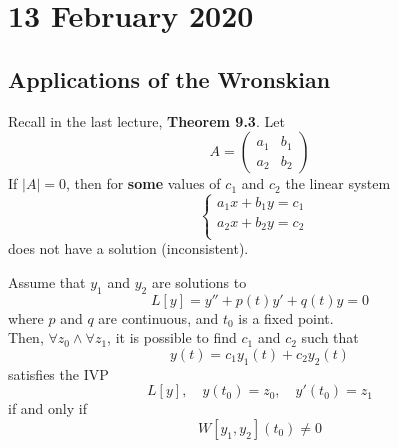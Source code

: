 \documentclass[diffeq.tex]{subfiles}
\begin{document}
\chapter{13 February 2020}
    \section{Applications of the Wronskian}
    \begin{corollary}
        Recall in the last lecture, \textbf{Theorem 9.3}.
        Let
        \begin{equation}
            A = \begin{pmatrix}
                a_{1} & b_{1}\\
                a_{2} & b_{2}
            \end{pmatrix}
        \end{equation}
        If $|A| = 0$, then for \textbf{some} values of $c_{1}$ and $c_{2}$ the linear system
        \begin{equation}
            \begin{cases}
                a_{1}x + b_{1}y = c_{1}&\\
                a_{2}x + b_{2}y = c_{2}&\\
            \end{cases}
        \end{equation}
        does not have a solution (inconsistent).
    \end{corollary}
    \np
    \begin{btheorem}
        Assume that $y_{1}$ and $y_{2}$ are solutions to
        \begin{equation}
            L[y] = y'' + p(t)y' + q(t)y = 0
        \end{equation}
        where $p$ and $q$ are continuous, and $t_{0}$ is a fixed point.\\
        Then, $\forall z_{0} \wedge \forall z_{1}$, it is possible to find $c_{1}$ and $c_{2}$ such that
        \begin{equation}
            y(t) = c_{1}y_{1}(t) + c_{2}y_{2}(t)
        \end{equation}
        satisfies the IVP
        \begin{equation}
            L[y],\quad  y(t_{0}) = z_{0},\quad y'(t_{0}) = z_{1}
        \end{equation}
        if and only if
        \begin{equation}
            W[y_{1}, y_{2}](t_{0}) \neq 0
        \end{equation}
    \end{btheorem}
\end{document}
